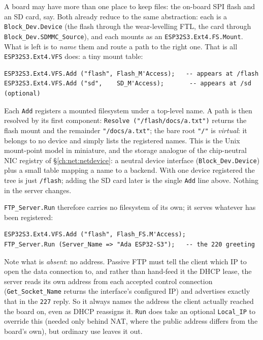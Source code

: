 A board may have more than one place to keep files: the on-board SPI flash and
an SD card, say. Both already reduce to the same abstraction: each is a
\texttt{Block\_Dev.Device} (the flash through the wear-levelling FTL, the card
through \texttt{Block\_Dev.SDMMC\_Source}), and each mounts as an
\texttt{ESP32S3.Ext4.FS.Mount}. What is left is to \emph{name} them and route a path
to the right one. That is all \texttt{ESP32S3.Ext4.VFS} does: a tiny mount table:

\begin{lstlisting}
ESP32S3.Ext4.VFS.Add ("flash", Flash_M'Access);   -- appears at /flash
ESP32S3.Ext4.VFS.Add ("sd",    SD_M'Access);       -- appears at /sd   (optional)
\end{lstlisting}

Each \texttt{Add} registers a mounted filesystem under a top-level name. A path is
then resolved by its first component: \texttt{Resolve ("/flash/docs/a.txt")} returns
the flash mount and the remainder \texttt{"/docs/a.txt"}; the bare root \texttt{"/"}
is \emph{virtual}: it belongs to no device and simply lists the registered names.
This is the Unix mount-point model in miniature, and the storage analogue of the
chip-neutral NIC registry of \S\ref{ch:net:netdevice}: a neutral device interface
(\texttt{Block\_Dev.Device}) plus a small table mapping a name to a backend. With
one device registered the tree is just \texttt{/flash}; adding the SD card later is
the single \texttt{Add} line above. Nothing in the server changes.

\texttt{FTP\_Server.Run} therefore carries no filesystem of its own; it serves
whatever has been registered:

\begin{lstlisting}
ESP32S3.Ext4.VFS.Add ("flash", Flash_FS.M'Access);
FTP_Server.Run (Server_Name => "Ada ESP32-S3");   -- the 220 greeting
\end{lstlisting}

Note what is \emph{absent}: no address. Passive FTP must tell the client which IP
to open the data connection to, and rather than hand-feed it the DHCP lease, the
server reads its own address from each accepted control connection
(\texttt{Get\_Socket\_Name} returns the interface's configured IP) and advertises
exactly that in the \texttt{227} reply. So it always names the address the client
actually reached the board on, even as DHCP reassigns it. \texttt{Run} does take an
optional \texttt{Local\_IP} to override this (needed only behind NAT, where the
public address differs from the board's own), but ordinary use leaves it out.


